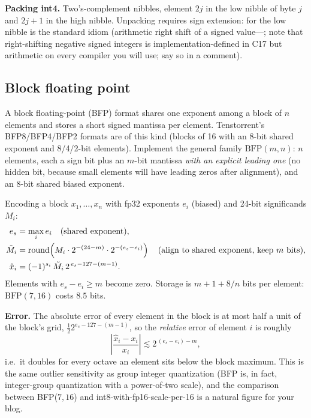 \textbf{Packing int4.} Two's-complement nibbles, element $2j$ in the low nibble of byte $j$ and $2j+1$ in the high nibble. Unpacking requires sign extension:  for the low nibble is the standard idiom (arithmetic right shift of a signed value---; note that right-shifting negative signed integers is implementation-defined in C17 but arithmetic on every compiler you will use; say so in a comment).

\subsection{Block floating point}

A block floating-point (BFP) format shares one exponent among a block of $n$ elements and stores a short signed mantissa per element. Tenstorrent's BFP8/BFP4/BFP2 formats are of this kind (blocks of 16 with an 8-bit shared exponent and 8/4/2-bit elements). Implement the general family $\mathrm{BFP}(m, n)$: $n$ elements, each a sign bit plus an $m$-bit mantissa \emph{with an explicit leading one} (no hidden bit, because small elements will have leading zeros after alignment), and an 8-bit shared biased exponent.

Encoding a block $x_1,\dots,x_n$ with fp32 exponents $e_i$ (biased) and 24-bit significands $M_i$:
\begin{align}
  e_s &= \max_i e_i \quad\text{(shared exponent)},\\
  \tilde{M}_i &= \operatorname{round}\!\left( M_i \cdot 2^{-(24-m)} \cdot 2^{-(e_s - e_i)} \right) \quad\text{(align to shared exponent, keep $m$ bits)},\\
  \hat{x}_i &= (-1)^{s_i}\, \tilde{M}_i\, 2^{\,e_s - 127 - (m-1)} .
\end{align}
Elements with $e_s - e_i \ge m$ become zero. Storage is $m + 1 + 8/n$ bits per element: $\mathrm{BFP}(7,16)$ costs $8.5$ bits.

\textbf{Error.} The absolute error of every element in the block is at most half a unit of the block's grid, $\tfrac12 2^{e_s-127-(m-1)}$, so the \emph{relative} error of element $i$ is roughly
\begin{equation}
  \left|\frac{\hat{x}_i - x_i}{x_i}\right| \lesssim 2^{\,(e_s - e_i) - m},
\end{equation}
i.e.\ it doubles for every octave an element sits below the block maximum. This is the same outlier sensitivity as group integer quantization (BFP is, in fact, integer-group quantization with a power-of-two scale), and the comparison between BFP($7,16$) and int8-with-fp16-scale-per-16 is a natural figure for your blog.

